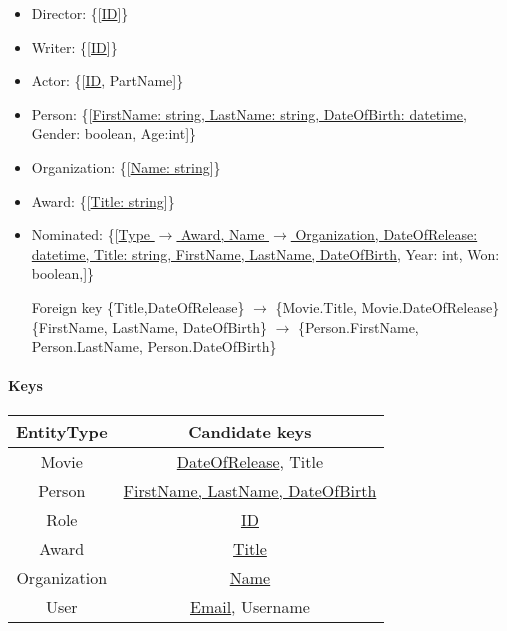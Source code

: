 \begin{itemize}
\item Director: \{[\underline{ID}]\}

\item Writer: \{[\underline{ID}]\}

\item Actor: \{[\underline{ID}, PartName]\}

\item Person: \{[\underline{FirstName: string, LastName: string, DateOfBirth: datetime}, Gender: boolean, Age:int]\}

\item Organization: \{[\underline{Name: string}]\}

\item Award: \{[\underline{Title: string}]\}

\item Nominated: \{[\underline{Type $ \rightarrow $ Award, Name $ \rightarrow $ Organization, DateOfRelease: datetime, Title: string, FirstName, LastName, DateOfBirth}, Year: int, Won: boolean,]\}

Foreign key \{Title,DateOfRelease\} $ \rightarrow $ \{Movie.Title, Movie.DateOfRelease\}
		\{FirstName, LastName, DateOfBirth\} $ \rightarrow $ \{Person.FirstName, Person.LastName, 
Person.DateOfBirth\}
\end{itemize}

\paragraph{Keys}

\begin{tabular}{| c | c |}
\hline
EntityType & Candidate keys\\
\hline 
\hline
Movie & \underline{DateOfRelease}, Title\\
\hline
Person & \underline{FirstName, LastName, DateOfBirth}\\
\hline
Role & \underline{ID}\\
\hline
\hline 
Award & \underline{Title}\\
\hline
Organization & \underline{Name}\\
\hline
User & \underline{Email}, Username\\
\hline
\end{tabular}

